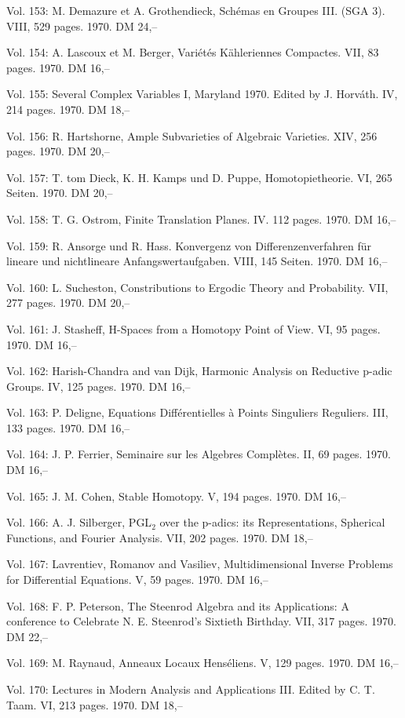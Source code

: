 Vol. 153: M. Demazure et A. Grothendieck, Schémas en Groupes III. (SGA 3). VIII, 529 pages. 1970. DM 24,--

Vol. 154: A. Lascoux et M. Berger, Variétés Kähleriennes Compactes. VII, 83 pages. 1970. DM 16,--

Vol. 155: Several Complex Variables I, Maryland 1970. Edited by J. Horváth. IV, 214 pages. 1970. DM 18,--

Vol. 156: R. Hartshorne, Ample Subvarieties of Algebraic Varieties. XIV, 256 pages. 1970. DM 20,--

Vol. 157: T. tom Dieck, K. H. Kamps und D. Puppe, Homotopietheorie. VI, 265 Seiten. 1970. DM 20,--

Vol. 158: T. G. Ostrom, Finite Translation Planes. IV. 112 pages. 1970. DM 16,--

Vol. 159: R. Ansorge und R. Hass. Konvergenz von Differenzenverfahren für lineare und nichtlineare Anfangswertaufgaben. VIII, 145 Seiten. 1970. DM 16,--

Vol. 160: L. Sucheston, Constributions to Ergodic Theory and Probability. VII, 277 pages. 1970. DM 20,--

Vol. 161: J. Stasheff, H-Spaces from a Homotopy Point of View. VI, 95 pages. 1970. DM 16,--

Vol. 162: Harish-Chandra and van Dijk, Harmonic Analysis on Reductive p-adic Groups. IV, 125 pages. 1970. DM 16,--

Vol. 163: P. Deligne, Equations Différentielles à Points Singuliers Reguliers. III, 133 pages. 1970. DM 16,--

Vol. 164: J. P. Ferrier, Seminaire sur les Algebres Complètes. II, 69 pages. 1970. DM 16,--

Vol. 165: J. M. Cohen, Stable Homotopy. V, 194 pages. 1970. DM 16,--

Vol. 166: A. J. Silberger, PGL$_2$ over the p-adics: its Representations, Spherical Functions, and Fourier Analysis. VII, 202 pages. 1970. DM 18,--

Vol. 167: Lavrentiev, Romanov and Vasiliev, Multidimensional Inverse Problems for Differential Equations. V, 59 pages. 1970. DM 16,--

Vol. 168: F. P. Peterson, The Steenrod Algebra and its Applications: A conference to Celebrate N. E. Steenrod's Sixtieth Birthday. VII, 317 pages. 1970. DM 22,--

Vol. 169: M. Raynaud, Anneaux Locaux Henséliens. V, 129 pages. 1970. DM 16,--

Vol. 170: Lectures in Modern Analysis and Applications III. Edited by C. T. Taam. VI, 213 pages. 1970. DM 18,--

